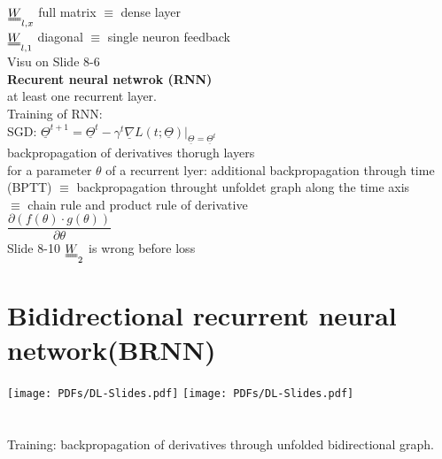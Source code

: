 \textbullet $  \W _{l,x } $ full matrix $  \equiv  $ dense layer \\
\textbullet $    \W_{l,1 } $ diagonal $  \equiv  $ single neuron feedback\\
Visu on Slide 8-6\\
\textbf{Recurent neural netwrok (RNN)}\\
at least one recurrent layer. \\
Training of RNN:\\
\textbullet SGD: $  \underline{\Theta}^{t+1}   = \underline{\Theta}^{t}  - \gamma ^t \underline{\nabla}L (t ; \underline{\Theta} ) | _{\underline{\Theta}^{} = \underline{\Theta}^{t}  } $\\
\textbullet backpropagation of derivatives thorugh layers \\
\textbullet for a parameter $  \theta  $ of a recurrent lyer: additional backpropagation through time (BPTT) $  \equiv  $ backpropagation throught unfoldet graph along the time axis \\
$  \equiv $ chain rule and product rule of derivative \\
$  \dfrac{\partial (f (\theta ) \cdot g (\theta))}{\partial \theta } $\\
\textbullet Slide 8-10 $  \W_2 $ is wrong before loss
\section{Bididrectional recurrent neural network(BRNN)}
\texttt{[image: PDFs/DL-Slides.pdf]}\newline\newpage
\texttt{[image: PDFs/DL-Slides.pdf]}\\
 \\
 \\
Training: backpropagation of derivatives through unfolded bidirectional graph. 
